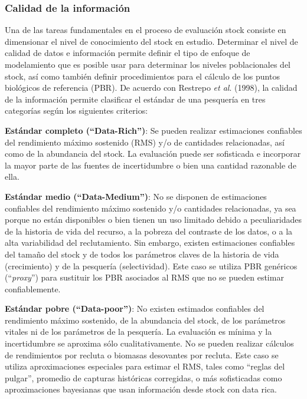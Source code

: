 \documentclass[letter,11pt]{article}
\begin{document}
\subsubsection{Calidad de la informaci\'on}

Una de las tareas fundamentales en el proceso de evaluaci\'on stock
consiste en dimensionar el nivel de conocimiento del stock en estudio.
Determinar el nivel de calidad de datos e informaci\'on permite definir el
tipo de enfoque de modelamiento que es posible usar para determinar los
niveles poblacionales del stock, as\'i como tambi\'en definir procedimientos
para el c\'alculo de los puntos biol\'ogicos de referencia (PBR). De acuerdo
con Restrepo \textit{et al}. (1998), la calidad de la informaci\'on
permite clasificar el est\'andar de una pesquer\'ia en tres categor\'ias seg\'un
los siguientes criterios:

\textbf{Est\'andar completo (\textquotedblleft Data-Rich\textquotedblright)}: Se pueden realizar
estimaciones confiables del rendimiento m\'aximo sostenido (RMS) y/o de
cantidades relacionadas, as\'i como de la abundancia del stock. La
evaluaci\'on puede ser sofisticada e incorporar la mayor parte de las
fuentes de incertidumbre o bien una cantidad razonable de ella.

\textbf{Est\'andar medio (\textquotedblleft Data-Medium\textquotedblright)}: No se disponen de
estimaciones confiables del rendimiento m\'aximo sostenido y/o cantidades
relacionadas, ya sea porque no est\'an disponibles o bien tienen un uso
limitado debido a peculiaridades de la historia de vida del recurso, a
la pobreza del contraste de los datos, o a la alta variabilidad del
reclutamiento. Sin embargo, existen estimaciones confiables del tama\~{n}o
del stock y de todos los par\'ametros claves de la historia de vida
(crecimiento) y de la pesquer\'ia (selectividad). Este caso se utiliza PBR
gen\'ericos (\textquotedblleft \emph{proxy}\textquotedblright) para sustituir los PBR asociados al RMS que
no se pueden estimar confiablemente.

\textbf{Est\'andar pobre (\textquotedblleft Data-poor\textquotedblright)}: No existen estimados confiables
del rendimiento m\'aximo sostenido, de la abundancia del stock, de los
par\'ametros vitales ni de los par\'ametros de la pesquer\'ia. La evaluaci\'on
es m\'inima y la incertidumbre se aproxima s\'olo cualitativamente. No se
pueden realizar c\'alculos de rendimientos por recluta o biomasas
desovantes por recluta. Este caso se utiliza aproximaciones especiales
para estimar el RMS, tales como \textquotedblleft reglas del pulgar\textquotedblright, promedio de
capturas hist\'oricas corregidas, o m\'as sofisticadas como aproximaciones
bayesianas que usan informaci\'on desde stock con data rica.
\end{document}

